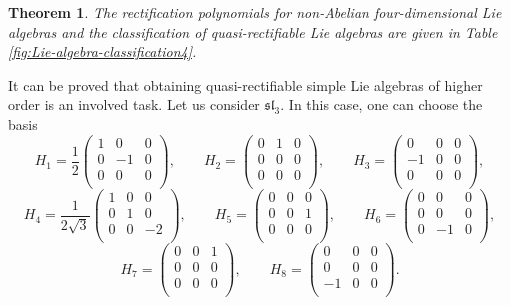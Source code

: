 \documentclass[12pt]{article}
\theoremstyle{plain}
\newtheorem{theorem}{Theorem}[section]
\newtheorem{proposition}[theorem]{Proposition}
\theoremstyle{definition}
\numberwithin{equation}{section}
\begin{document}
\begin{theorem} The rectification polynomials for non-Abelian four-dimensional Lie algebras and the classification of quasi-rectifiable Lie algebras are given in Table  \ref{fig:Lie-algebra-classification4}.
\end{theorem}


It can be proved that obtaining quasi-rectifiable simple Lie algebras of higher order is an involved task. Let us consider $\mathfrak{sl}_3$. In this case, one can choose the basis
$$
H_1=\frac{1}{2} \left(
\begin{array}{ccc}
 1 & 0 & 0 \\
 0 & -1 & 0 \\
 0 & 0 & 0 \\
\end{array}
\right),\qquad H_2=\left(
\begin{array}{ccc}
 0 & 1 & 0 \\
 0 & 0 & 0 \\
 0 & 0 & 0 \\
\end{array}
\right),\qquad H_3=\left(
\begin{array}{ccc}
 0 & 0 & 0 \\
 -1 & 0 & 0 \\
 0 & 0 & 0 \\
\end{array}
\right),$$
$$
H_4=\frac1{2 \sqrt{3}}{\left(
\begin{array}{ccc}
 1 & 0 & 0 \\
 0 & 1 & 0 \\
 0 & 0 & -2 \\
\end{array}
\right)},\qquad H_5=\left(
\begin{array}{ccc}
 0 & 0 & 0 \\
 0 & 0 & 1 \\
 0 & 0 & 0 \\
\end{array}
\right),\qquad H_6=\left(
\begin{array}{ccc}
 0 & 0 & 0 \\
 0 & 0 & 0 \\
 0 & -1 & 0 \\
\end{array}
\right),
$$
$$
H_7=\left(
\begin{array}{ccc}
 0 & 0 & 1 \\
 0 & 0 & 0 \\
 0 & 0 & 0 \\
\end{array}
\right),\qquad H_8=\left(
\begin{array}{ccc}
 0 & 0 & 0 \\
 0 & 0 & 0 \\
 -1 & 0 & 0 \\
\end{array}
\right).
$$
\end{document}
